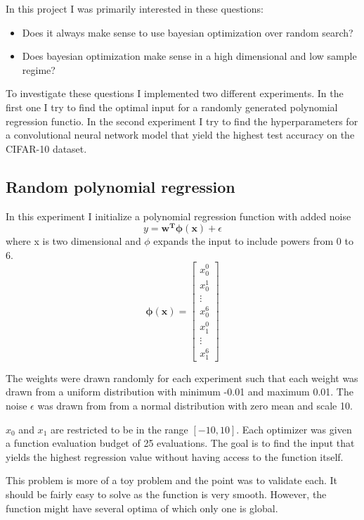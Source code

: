 
In this project I was primarily interested in these questions:
\begin{itemize}
    \item Does it always make sense to use bayesian optimization over random search?
    \item Does bayesian optimization make sense in a high dimensional and low sample regime?
\end{itemize}

To investigate these questions I implemented two different experiments. In the first one I try to find the optimal input for a randomly generated polynomial regression functio. In the second experiment I try to find the hyperparameters for a convolutional neural network model that yield the highest test accuracy on the CIFAR-10 dataset.

\subsection{Random polynomial regression}

In this experiment I initialize a polynomial regression function with added noise
\[
    y = \boldsymbol{w^T\phi(x)} + \epsilon
\]
where x is two dimensional and $\phi$ expands the input to include powers from 0 to 6.
\[
    \boldsymbol{\phi(x)} = \begin{bmatrix}
        x_0^0 \\
        x_0^1 \\
        \vdots \\
        x_0^6 \\
        x_1^0 \\
        \vdots \\
        x_1^6
    \end{bmatrix}
\]

The weights were drawn randomly for each experiment such that each weight was drawn from a uniform distribution with minimum -0.01 and maximum 0.01. The noise $\epsilon$ was drawn from from a normal distribution with zero mean and scale 10.

$x_0$ and $x_1$ are restricted to be in the range $[-10, 10]$. Each optimizer was given a function evaluation budget of 25 evaluations. The goal is to find the input that yields the highest regression value without having access to the function itself.

This problem is more of a toy problem and the point was to validate each. It should be fairly easy to solve as the function is very smooth. However, the function might have several optima of which only one is global.

